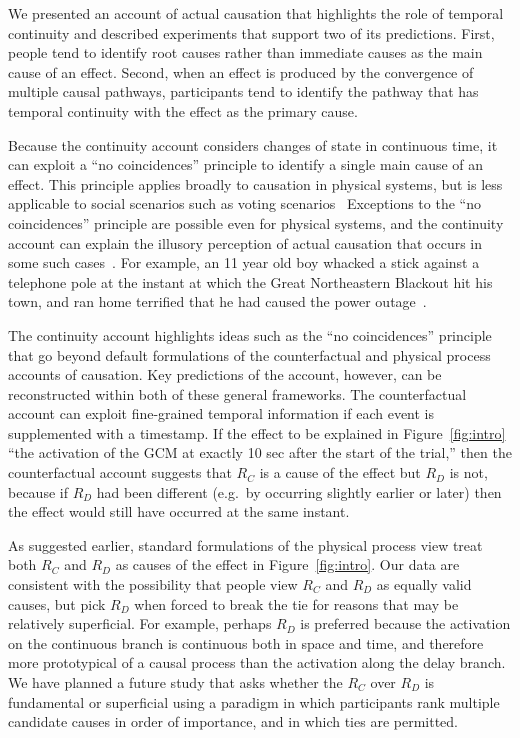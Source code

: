 \documentclass[10pt,letterpaper]{article}
\newcommand{\ev}[2]{$#1_#2$}
\begin{document}
We presented an account of actual causation that highlights the role of temporal continuity and described experiments that support two of its predictions. First, people tend to identify root causes rather than immediate causes as the main cause of an effect. Second, when an effect is produced by the convergence of multiple causal pathways, participants tend to identify the pathway that has temporal continuity with the effect as the primary cause.

Because the continuity account considers changes of state in continuous time, it can exploit a ``no coincidences'' principle to identify a single main cause of an effect. This principle applies broadly to causation in physical systems, but is less applicable to social scenarios such as voting scenarios~\cite{livengood13} Exceptions to the ``no coincidences'' principle are possible even for physical systems, and the continuity account can explain the illusory perception of actual causation that occurs in some such cases~\cite{thorstadw16}. For example, an 11 year old boy whacked a stick against a telephone pole at the instant at which the Great Northeastern Blackout hit his town, and ran home terrified that he had caused the power outage~\cite{gelbr1965night}. 

The continuity account highlights ideas such as the ``no coincidences'' principle that go beyond default formulations of the counterfactual and physical process accounts of causation. Key predictions of the account, however, can be reconstructed within both of these general frameworks. The counterfactual account can exploit fine-grained temporal information if each event is supplemented with a timestamp. If the effect to be explained in Figure~\ref{fig:intro} ``the activation of the GCM at exactly 10 sec after the start of the trial,'' then the counterfactual account suggests that \ev{R}{C} is a cause of the effect but \ev{R}{D} is not, because if \ev{R}{D} had been different (e.g.\ by occurring slightly earlier or later) then the effect would still have occurred at the same instant.

As suggested earlier, standard formulations of the physical process view treat both \ev{R}{C} and \ev{R}{D} as causes of the effect in Figure~\ref{fig:intro}. Our data are consistent with the possibility that people view \ev{R}{C} and \ev{R}{D} as equally valid causes, but pick \ev{R}{D} when forced to break the tie for reasons that may be relatively superficial. For example, perhaps \ev{R}{D} is preferred because the activation on the continuous branch is continuous both in space and time, and therefore more prototypical of a causal process than the activation along the delay branch. We have planned a future study that asks whether the \ev{R}{C} over \ev{R}{D} is fundamental or superficial using a paradigm in which participants rank multiple candidate causes in order of importance, and in which ties are permitted. 






\setlength{\bibleftmargin}{.125in}
\setlength{\bibindent}{-\bibleftmargin}


\end{document}
